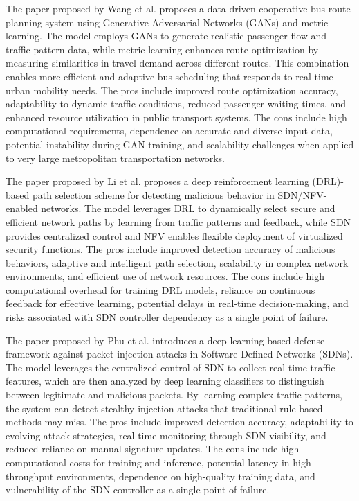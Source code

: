 \documentclass[a4paper,fleqn]{cas-dc}
\numberwithin{equation}{section}
\begin{document}
The paper proposed by Wang et al.\cite{Wang2024427} proposes a data-driven cooperative bus route planning system using Generative Adversarial Networks (GANs) and metric learning. The model employs GANs to generate realistic passenger flow and traffic pattern data, while metric learning enhances route optimization by measuring similarities in travel demand across different routes. This combination enables more efficient and adaptive bus scheduling that responds to real-time urban mobility needs. The pros include improved route optimization accuracy, adaptability to dynamic traffic conditions, reduced passenger waiting times, and enhanced resource utilization in public transport systems. The cons include high computational requirements, dependence on accurate and diverse input data, potential instability during GAN training, and scalability challenges when applied to very large metropolitan transportation networks.

The paper proposed by Li et al.\cite{Li2023} proposes a deep reinforcement learning (DRL)-based path selection scheme for detecting malicious behavior in SDN/NFV-enabled networks. The model leverages DRL to dynamically select secure and efficient network paths by learning from traffic patterns and feedback, while SDN provides centralized control and NFV enables flexible deployment of virtualized security functions. The pros include improved detection accuracy of malicious behaviors, adaptive and intelligent path selection, scalability in complex network environments, and efficient use of network resources. The cons include high computational overhead for training DRL models, reliance on continuous feedback for effective learning, potential delays in real-time decision-making, and risks associated with SDN controller dependency as a single point of failure.

The paper proposed by Phu et al.\cite{Phu2023} introduces a deep learning-based defense framework against packet injection attacks in Software-Defined Networks (SDNs). The model leverages the centralized control of SDN to collect real-time traffic features, which are then analyzed by deep learning classifiers to distinguish between legitimate and malicious packets. By learning complex traffic patterns, the system can detect stealthy injection attacks that traditional rule-based methods may miss. The pros include improved detection accuracy, adaptability to evolving attack strategies, real-time monitoring through SDN visibility, and reduced reliance on manual signature updates. The cons include high computational costs for training and inference, potential latency in high-throughput environments, dependence on high-quality training data, and vulnerability of the SDN controller as a single point of failure.
\end{document}
